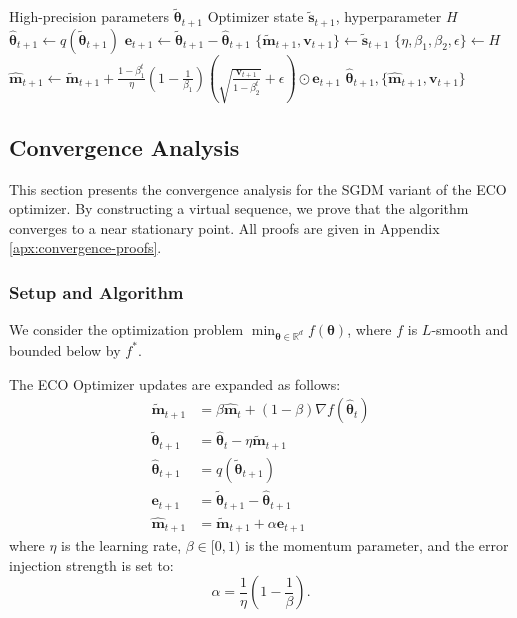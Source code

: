 \documentclass[11pt, a4paper, onecolumn, copyright, goog]{google}
\newcommand{\methodname}{ECO}
\newcommand{\vect}[1]{\mathbf{#1}}
\newcommand{\vtheta}{\boldsymbol{\theta}}
\newcommand{\vm}{\vect{m}}
\newcommand{\vvv}{\vect{v}}
\newcommand{\ve}{\vect{e}}
\newcommand{\vs}{\vect{s}}
\newcommand{\qfn}{\textit{q}}
\newcommand{\qfneco}{\textit{ECO\_QUANTIZE}}
\newcommand{\R}{\mathbb{R}}
\theoremstyle{plain}
\theoremstyle{definition}
\theoremstyle{remark}
\begin{document}
\begin{algorithm}[ht]
\caption{$\qfneco$ for Adam}
\label{alg:qeco_adam}
\begin{algorithmic}[1]
\Require High-precision parameters $\tilde{\vtheta}_{t+1}$
\Require Optimizer state $\tilde{\vs}_{t+1}$, hyperparameter $H$
\State $\hat{\vtheta}_{t+1} \leftarrow \qfn(\tilde{\vtheta}_{t+1})$ 
\State $\ve_{t+1} \leftarrow \tilde{\vtheta}_{t+1}-\hat{\vtheta}_{t+1}$ 
\State $\{\tilde{\vm}_{t+1}, \vvv_{t+1}\} \leftarrow \tilde{\vs}_{t+1}$ 
\State $\{\eta, \beta_1, \beta_2, \epsilon\} \leftarrow H$ 
\State $\hat{\vm}_{t+1} \leftarrow \tilde{\vm}_{t+1} + \frac{1 - \beta_1^t}{\eta}(1-\frac{1}{\beta_1}) (\sqrt{\frac{\vvv_{t+1}}{1 - \beta_2^t}} + \epsilon) \odot \ve_{t+1}$ 
\State \Return $\hat{\vtheta}_{t+1}, \{\hat{\vm}_{t+1}, \vvv_{t+1}\}$
\end{algorithmic}
\end{algorithm}

\subsection{Convergence Analysis}
This section presents the convergence analysis for the SGDM variant of the ECO optimizer. By constructing a virtual sequence, we prove that the algorithm converges to a near stationary point. All proofs are given in Appendix \ref{apx:convergence-proofs}.

\subsubsection{Setup and Algorithm}

We consider the optimization problem $\min_{\vtheta \in \R^d} f(\vtheta)$, where $f$ is $L$-smooth and bounded below by $f^*$.

The \methodname{} Optimizer updates are expanded as follows:
\begin{align}
    \tilde{\vm}_{t+1} &= \beta \hat{\vm}_t + (1-\beta) \nabla f(\hat{\vtheta}_t) \label{eq:m_tilde} \\
    \tilde{\vtheta}_{t+1} &= \hat{\vtheta}_t - \eta \tilde{\vm}_{t+1} \label{eq:theta_tilde} \\
    \hat{\vtheta}_{t+1} &= q(\tilde{\vtheta}_{t+1}) \label{eq:quant} \\
    \ve_{t+1} &= \tilde{\vtheta}_{t+1} - \hat{\vtheta}_{t+1} \label{eq:error} \\
    \hat{\vm}_{t+1} &= \tilde{\vm}_{t+1} + \alpha \ve_{t+1} \label{eq:m_hat}
\end{align}
where $\eta$ is the learning rate, $\beta \in [0,1)$ is the momentum parameter, and the error injection strength is set to:
\begin{equation}
    \alpha = \frac{1}{\eta}\left(1 - \frac{1}{\beta}\right). \label{eq:alpha}
\end{equation}
\end{document}
